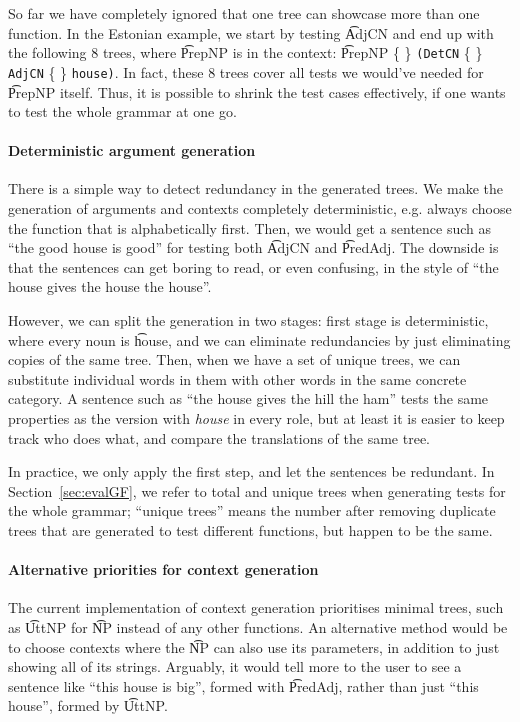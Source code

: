 So far we have completely ignored that one tree can showcase more than
one function. In the Estonian example, we start
by testing \t{AdjCN} and end up with the following 8 trees, where
\t{PrepNP} is in the context: 
\t{PrepNP} \{  \}
             {\tt (DetCN} \{  \} 
             {\tt AdjCN}  \{ \} 
             {\tt house)}.
In fact, these 8 trees cover all tests we would've needed for
\t{PrepNP} itself. Thus, it is possible to shrink the test cases
effectively, if one wants to test the whole grammar at one go.

\paragraph{Deterministic argument generation}
There is a simple way to detect redundancy in the generated trees. We
make the generation of arguments and contexts completely
deterministic, e.g. always choose the function that is alphabetically
first. Then, we would get a sentence such as ``the good house is
good'' for testing both \t{AdjCN} and \t{PredAdj}. The downside is
that the sentences can get boring to read, or even confusing, in the
style of ``the house gives the house the house''.

However, we can split the generation in two stages:
first stage is deterministic, where every noun is \t{house}, and we
can eliminate redundancies by just eliminating copies of the same
tree. Then, when we have a set of unique trees, we can substitute
individual words in them with other words in the same concrete
category.  A sentence such as ``the house gives the hill the
ham'' tests the same properties as the version with \emph{house} in every
role, but at least it is easier to keep track who does what, and
compare the translations of the same tree.

In practice, we only apply the first step, and let the sentences be
redundant. In Section~\ref{sec:evalGF}, we refer to total and unique
trees when generating tests for the whole grammar; ``unique trees''
means the number after removing duplicate trees that are generated to
test different functions, but happen to be the same.

\paragraph{Alternative priorities for context generation} The current
implementation of context generation prioritises minimal trees, such
as \t{UttNP} for \t{NP} instead of any other functions. An alternative
method would be to choose contexts where the \t{NP} can also use its
parameters, in addition to just showing all of its strings. Arguably,
it would tell more to the user to see a sentence like ``this house is
big'', formed with \t{PredAdj}, rather than just ``this house'',
formed by \t{UttNP}. 

